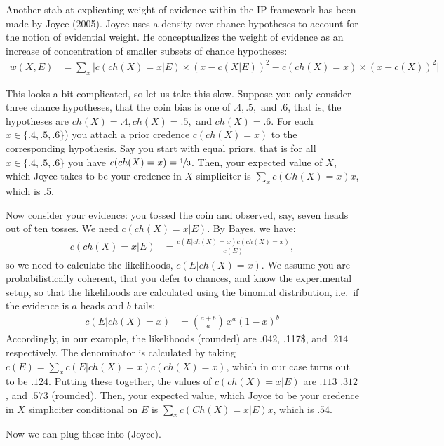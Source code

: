 \documentclass[
  10pt,
  dvipsnames,enabledeprecatedfontcommands]{scrartcl}
\begin{document}
Another stab at explicating weight of evidence within the \textsf{IP}
framework has been made by Joyce (2005). Joyce uses a density over
chance hypotheses to account for the notion of evidential weight. He
conceptualizes the weight of evidence as an increase of concentration of
smaller subsets of chance hypotheses: \begin{align}
\tag{Joyce} w(X,E) & = \sum_x \vert c(ch(X) = x  \vert E) \times (x - c(X\vert E))^2 - c(ch(X) = x) \times (x - c(X))^2\vert
\end{align}

\noindent This looks a bit complicated, so let us take this slow.
Suppose you only consider three chance hypotheses, that the coin bias is
one of \(.4, .5,\) and \(.6\), that is, the hypotheses are
\(ch(X) = .4, ch(X)=.5,\) and \(ch(X)=.6\). For each
\(x\in \{.4, .5, .6\}\)) you attach a prior credence \(c(ch(X) = x)\) to
the corresponding hypothesis. Say you start with equal priors, that is
for all \(x\in \{.4, .5, .6\}\) you have
\(c(ch(X) =x) = \nicefrac{1}{3}\). Then, your expected value of \(X\),
which Joyce takes to be your credence in \(X\) simpliciter is
\(\sum_x c(Ch(X)=x)x\), which is .5.

Now consider your evidence: you tossed the coin and observed, say, seven
heads out of ten tosses. We need \(c(ch(X)=x \vert E)\). By Bayes, we
have: \begin{align*}
c(ch(X)=x \vert E) & = \frac{c(E \vert ch(X) =x) c(ch(X)=x )}{c(E)},
\end{align*} \noindent so we need to calculate the likelihoods,
\(c(E \vert ch(X) =x)\). We assume you are probabilistically coherent,
that you defer to chances, and know the experimental setup, so that the
likelihoods are calculated using the binomial distribution, i.e.~if the
evidence is \(a\) heads and \(b\) tails: \begin{align*}
c(E \vert ch(X) =x) & = {a+b \choose a}\,x ^a (1-x)^{b}
\end{align*} \noindent Accordingly, in our example, the likelihoods
(rounded) are .042, .117\$, and \(.214\) respectively. The denominator
is calculated by taking
\(c(E) = \sum_x c(E \vert ch(X) =x) c(ch(X)=x)\), which in our case
turns out to be \(.124\). Putting these together, the values of
\(c(ch(X)=x \vert E)\) are \(.113\) \(.312\), and \(.573\) (rounded).
Then, your expected value, which Joyce to be your credence in \(X\)
simpliciter conditional on \(E\) is \(\sum_x c(Ch(X)=x\vert E)x\), which
is \(.54\).

Now we can plug these into (Joyce).
\end{document}
